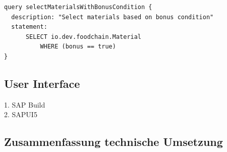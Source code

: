 
\begin{lstlisting}[caption={Abfragedefinition},label=lst:model-permissions]
query selectMaterialsWithBonusCondition {
  description: "Select materials based on bonus condition"
  statement:
      SELECT io.dev.foodchain.Material
          WHERE (bonus == true)
}
\end{lstlisting}


\subsection{User Interface}
1. SAP Build\\
2. SAPUI5

\subsection{Zusammenfassung technische Umsetzung}



\newpage
